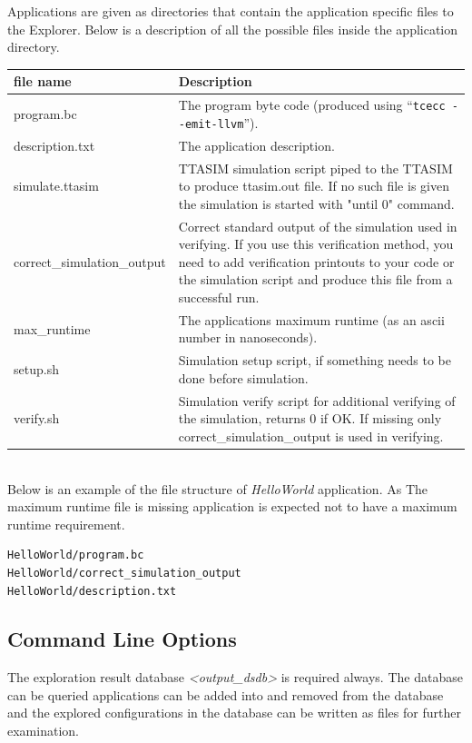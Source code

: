 \documentclass[twoside]{tceusermanual}
\begin{document}
Applications are given as directories that contain the application specific
files to the Explorer. Below is a description of all the possible files inside
the application directory.

\begin{tabular}{p{}p{}}
\textbf{file name} &\textbf{Description} \\
\hline
program.bc & The program byte code (produced using ``\verb|tcecc --emit-llvm|'').\\
description.txt & The application description.\\
simulate.ttasim & TTASIM simulation script piped to the TTASIM to produce
ttasim.out file. If no such file is given the simulation is started with
"until 0" command.\\
correct\_simulation\_output & Correct standard output of the simulation used in
verifying. If you use this verification method, you need to add verification 
printouts to your code or the simulation script and produce this file from a
successful run.\\
max\_runtime & The applications maximum runtime (as an ascii number in nanoseconds).\\
setup.sh & Simulation setup script, if something needs to be done before
simulation.\\
verify.sh & Simulation verify script for additional verifying of the
simulation, returns 0 if OK. If missing only correct\_simulation\_output is used
in verifying.\\
\end{tabular}\\

Below is an example of the file structure of \emph{HelloWorld} application.
As The maximum runtime file is missing application is expected not to have a
maximum runtime requirement.
\begin{verbatim}
HelloWorld/program.bc
HelloWorld/correct_simulation_output
HelloWorld/description.txt
\end{verbatim}

\subsection{Command Line Options}

The exploration result database \emph{<output\_dsdb>} is required always. The
database can be queried applications can be added into and removed from the 
database and the explored configurations in the database can be written as
files for further examination.
\end{document}
